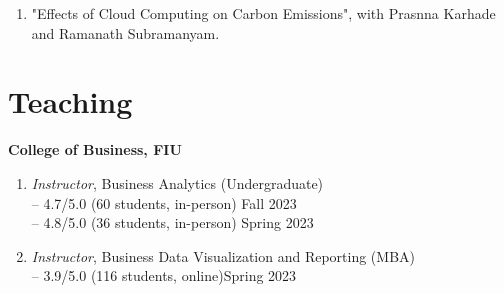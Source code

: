 \documentclass[margin,line]{resume}
\begin{document}
\begin{resume}
\begin{enumerate}[topsep=0pt, leftmargin=*]

       \item "Effects of Cloud Computing on Carbon Emissions", with Prasnna Karhade and Ramanath Subramanyam. 


	  \end{enumerate}
	  

	  
 	  \section{\mysidestyle Teaching} 
 	  \textbf{College of Business, FIU}
 	    \begin{enumerate}[topsep=1pt, leftmargin=*]
         \item {\sl Instructor}, Business Analytics (Undergraduate)\\
         -- 4.7/5.0 (60 students, in-person) \hfill Fall 2023\\
         -- 4.8/5.0 (36 students, in-person) \hfill Spring 2023
         \item {\sl Instructor}, Business Data Visualization and Reporting (MBA)\\
         -- 3.9/5.0 (116 students, online)\hfill Spring 2023
         \end{enumerate}
 	  

\end{resume}
\end{document}

